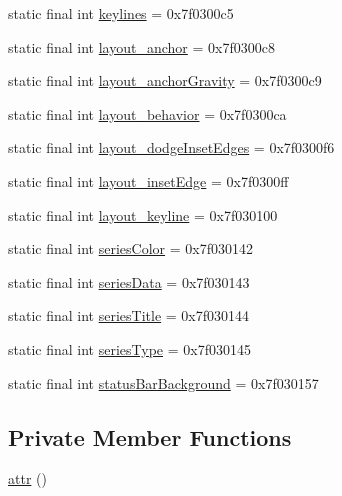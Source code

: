 \begin{DoxyCompactItemize}
\item 
static final int \mbox{\hyperlink{classcom_1_1jjoe64_1_1graphview_1_1_r_1_1attr_aae812cefa6378a6cbed7b3941fb3aa33}{keylines}} = 0x7f0300c5
\item 
static final int \mbox{\hyperlink{classcom_1_1jjoe64_1_1graphview_1_1_r_1_1attr_ae18ec98d8dbb71a1e84b2df2efeffe28}{layout\+\_\+anchor}} = 0x7f0300c8
\item 
static final int \mbox{\hyperlink{classcom_1_1jjoe64_1_1graphview_1_1_r_1_1attr_aa2b970fea55527fe94c7126af94d73cf}{layout\+\_\+anchor\+Gravity}} = 0x7f0300c9
\item 
static final int \mbox{\hyperlink{classcom_1_1jjoe64_1_1graphview_1_1_r_1_1attr_a360d627e52b8d3c8b4b4054d280e7092}{layout\+\_\+behavior}} = 0x7f0300ca
\item 
static final int \mbox{\hyperlink{classcom_1_1jjoe64_1_1graphview_1_1_r_1_1attr_a133b5cd6336e10053c15f99dd346bc8d}{layout\+\_\+dodge\+Inset\+Edges}} = 0x7f0300f6
\item 
static final int \mbox{\hyperlink{classcom_1_1jjoe64_1_1graphview_1_1_r_1_1attr_a64d10dfcb6e3a7a46293f0f2360e747d}{layout\+\_\+inset\+Edge}} = 0x7f0300ff
\item 
static final int \mbox{\hyperlink{classcom_1_1jjoe64_1_1graphview_1_1_r_1_1attr_a32e59b861a76030d1d535e2cc86f8ca2}{layout\+\_\+keyline}} = 0x7f030100
\item 
static final int \mbox{\hyperlink{classcom_1_1jjoe64_1_1graphview_1_1_r_1_1attr_af9176ff2923cec209dd211a5f8fd9b56}{series\+Color}} = 0x7f030142
\item 
static final int \mbox{\hyperlink{classcom_1_1jjoe64_1_1graphview_1_1_r_1_1attr_a0ff718489662a72faaa88ce0d85eb2d9}{series\+Data}} = 0x7f030143
\item 
static final int \mbox{\hyperlink{classcom_1_1jjoe64_1_1graphview_1_1_r_1_1attr_a69a11fac8bffce2531cb2506da58f3ad}{series\+Title}} = 0x7f030144
\item 
static final int \mbox{\hyperlink{classcom_1_1jjoe64_1_1graphview_1_1_r_1_1attr_a22906eee4b28b40bc14ce32410ac7ee3}{series\+Type}} = 0x7f030145
\item 
static final int \mbox{\hyperlink{classcom_1_1jjoe64_1_1graphview_1_1_r_1_1attr_aacda7c55a6f17a953acfa1be99d02510}{status\+Bar\+Background}} = 0x7f030157
\end{DoxyCompactItemize}
\subsection*{Private Member Functions}
\begin{DoxyCompactItemize}
\item 
\mbox{\hyperlink{classcom_1_1jjoe64_1_1graphview_1_1_r_1_1attr_a646ba5ebaec816238ec3e4a3ad0d5a93}{attr}} ()
\end{DoxyCompactItemize}


